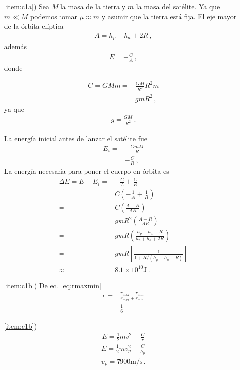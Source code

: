 \begin{itemize}
\item[\ref{item:c1a})] Sea $M$ la masa de la tierra y $m$ la masa
  del satélite. Ya que $m\ll M$ podemos tomar $\mu\approx m$ y
  asumir que la tierra está fija. El eje mayor de la órbita elíptica
  \begin{align*}
    A=h_p+h_a+2R\,,
  \end{align*}
  además   
  \begin{align*}
    E=-\frac{C}{A}\,,
  \end{align*}
  donde

  \begin{align*}
    C=GMm=&\frac{GM}{R^2}R^2 m\nonumber\\
    =&g m R^2\,,
  \end{align*}
  ya que
  \begin{align*}
    g=\frac{GM}{R^2}\,.
  \end{align*}

  La energía inicial antes de lanzar el satélite fue
  \begin{align*}
    E_i=&-\frac{GmM}{R}\nonumber\\
    =&-\frac{C}{R}\,,
  \end{align*}
  La energía necesaria para poner el cuerpo en órbita es
  \begin{align*}
    \Delta E=E-E_i=&-\frac{C}{A}+\frac{C}{R}\nonumber\\
    =&C\left( -\frac{1}{A}+\frac{1}{R}     \right)\nonumber\\
    =&C\left( \frac{A-R}{AR}     \right)\nonumber\\
    =&g m R^2\left( \frac{A-R}{AR}     \right)\nonumber\\
    =&g m R\left( \frac{h_p+h_a+R}{h_p+h_a+2R}     \right)\nonumber\\
    =&g m R\left[ \frac{1}{1+R/(h_p+h_a+R)}     \right]\nonumber\\
    \approx&8.1\times 10^{10}\si{\joule}\,.
  \end{align*}
 \item[\ref{item:c1b})] De ec.~\eqref{eq:rmaxmin}
   \begin{align*}
     \epsilon=&\frac{r_{\text{max}}-r_{\text{min}}}{r_{\text{max}}+r_{\text{min}}}\nonumber\\
     =&\frac{1}{6}
   \end{align*}
 \item[\ref{item:c1b})]
   \begin{align*}
     E=\frac{1}{2}mv^2-\frac{C}{r}
   \end{align*}
   \begin{align*}
     E=\frac{1}{2}mv_p^2-\frac{C}{h_p}
   \end{align*}
   \begin{align*}
     v_p=7900\si{\meter\per\second}\,.
   \end{align*}
  \end{itemize}



\begin{extrapage}
  \newpage
  \qquad
  \newpage
\end{extrapage}


